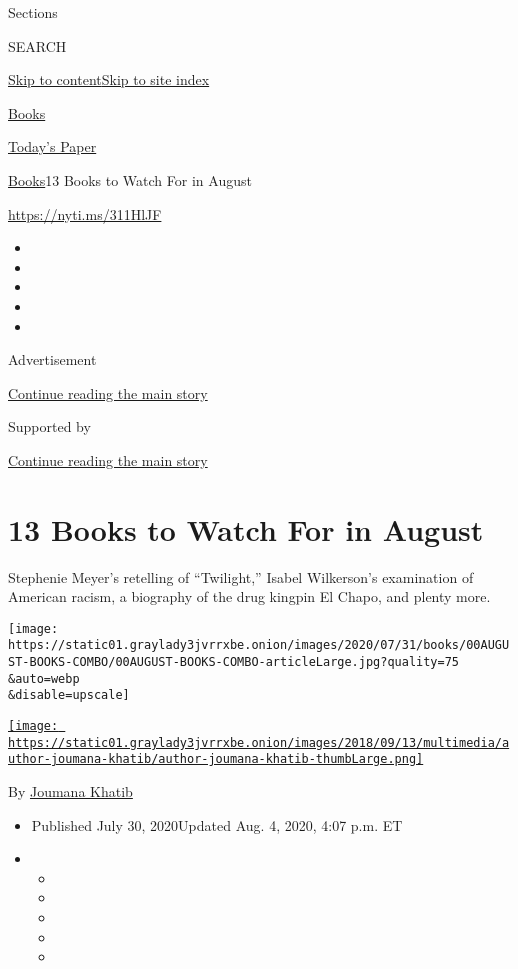 Sections

SEARCH

\protect\hyperlink{site-content}{Skip to
content}\protect\hyperlink{site-index}{Skip to site index}

\href{https://www.nytimes3xbfgragh.onion/section/books}{Books}

\href{https://myaccount.nytimes3xbfgragh.onion/auth/login?response_type=cookie\&client_id=vi}{}

\href{https://www.nytimes3xbfgragh.onion/section/todayspaper}{Today's
Paper}

\href{/section/books}{Books}\textbar{}13 Books to Watch For in August

\url{https://nyti.ms/311HlJF}

\begin{itemize}
\item
\item
\item
\item
\item
\end{itemize}

Advertisement

\protect\hyperlink{after-top}{Continue reading the main story}

Supported by

\protect\hyperlink{after-sponsor}{Continue reading the main story}

\hypertarget{13-books-to-watch-for-in-august}{%
\section{13 Books to Watch For in
August}\label{13-books-to-watch-for-in-august}}

Stephenie Meyer's retelling of ``Twilight,'' Isabel Wilkerson's
examination of American racism, a biography of the drug kingpin El
Chapo, and plenty more.

\texttt{[image: https://static01.graylady3jvrrxbe.onion/images/2020/07/31/books/00AUGUST-BOOKS-COMBO/00AUGUST-BOOKS-COMBO-articleLarge.jpg?quality=75\\\&auto=webp\\\&disable=upscale]}

\href{https://nytimes3xbfgragh.onion/by/joumana-khatib}{\texttt{[image: https://static01.graylady3jvrrxbe.onion/images/2018/09/13/multimedia/author-joumana-khatib/author-joumana-khatib-thumbLarge.png]}}

By \href{https://nytimes3xbfgragh.onion/by/joumana-khatib}{Joumana
Khatib}

\begin{itemize}
\item
  Published July 30, 2020Updated Aug. 4, 2020, 4:07 p.m. ET
\item
  \begin{itemize}
  \item
  \item
  \item
  \item
  \item
  \end{itemize}
\end{itemize}

